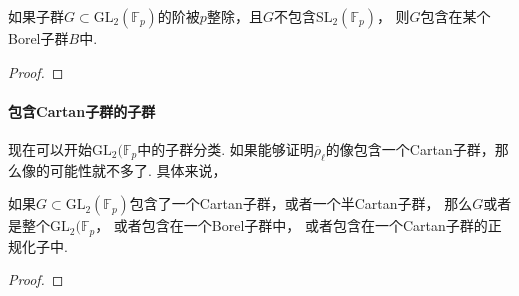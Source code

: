 \begin{cprop}
    如果子群$G\subset \mathrm{GL}_2(\mathbb{F}_p)$的阶被$p$整除，且$G$不包含$\mathrm{SL}_2(\mathbb{F}_p)$，
    则$G$包含在某个Borel子群$B$中.
\end{cprop}

\begin{proof}
\end{proof}

\paragraph{包含Cartan子群的子群}

现在可以开始$\mathrm{GL}_2(\mathbb{F}_p$中的子群分类.
如果能够证明$\overline{\rho}_{\ell}$的像包含一个Cartan子群，那么像的可能性就不多了.
具体来说，
\begin{cprop}
    如果$G\subset \mathrm{GL}_2(\mathbb{F}_p)$包含了一个Cartan子群，或者一个半Cartan子群，
    那么$G$或者是整个$ \mathrm{GL}_2(\mathbb{F}_p$，
    或者包含在一个Borel子群中，
    或者包含在一个Cartan子群的正规化子中.
\end{cprop}

\begin{proof}
\end{proof}
